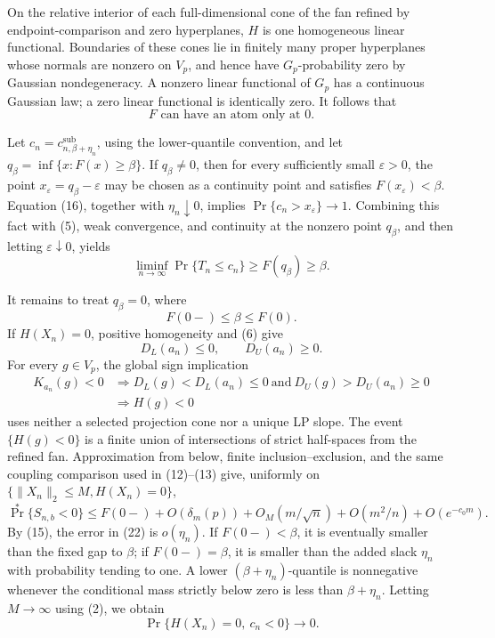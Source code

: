 On the relative interior of each full-dimensional cone of the fan refined by endpoint-comparison and zero hyperplanes, \(H\) is one homogeneous linear functional.  Boundaries of these cones lie in finitely many proper hyperplanes whose normals are nonzero on \(V_p\), and hence have \(G_p\)-probability zero by Gaussian nondegeneracy.  A nonzero linear functional of \(G_p\) has a continuous Gaussian law; a zero linear functional is identically zero.  It follows that
\[
F\text{ can have an atom only at }0.
\tag{17}
\]

Let \(c_n=c^{\mathrm{sub}}_{n,\beta+\eta_n}\), using the lower-quantile convention, and let \(q_\beta=\inf\{x:F(x)\geq\beta\}\).  If \(q_\beta\neq0\), then for every sufficiently small \(\varepsilon>0\), the point \(x_\varepsilon=q_\beta-\varepsilon\) may be chosen as a continuity point and satisfies \(F(x_\varepsilon)<\beta\).  Equation (16), together with \(\eta_n\downarrow0\), implies \(\Pr\{c_n>x_\varepsilon\}\to1\).  Combining this fact with (5), weak convergence, and continuity at the nonzero point \(q_\beta\), and then letting \(\varepsilon\downarrow0\), yields
\[
\liminf_{n\to\infty}\Pr\{T_n\leq c_n\}
\geq F(q_\beta)\geq\beta.
\tag{18}
\]

It remains to treat \(q_\beta=0\), where
\[
F(0-)\leq\beta\leq F(0).
\tag{19}
\]
If \(H(X_n)=0\), positive homogeneity and (6) give
\[
D_L(a_n)\leq0,
\qquad D_U(a_n)\geq0.
\tag{20}
\]
For every \(g\in V_p\), the global sign implication
\[
\begin{aligned}
K_{a_n}(g)<0
&\Longrightarrow D_L(g)<D_L(a_n)\leq0
\ \text{and}\ D_U(g)>D_U(a_n)\geq0\\
&\Longrightarrow H(g)<0
\end{aligned}
\tag{21}
\]
uses neither a selected projection cone nor a unique LP slope.  The event \(\{H(g)<0\}\) is a finite union of intersections of strict half-spaces from the refined fan.  Approximation from below, finite inclusion--exclusion, and the same coupling comparison used in (12)--(13) give, uniformly on \(\{\|X_n\|_2\leq M,H(X_n)=0\}\),
\[
\Pr^*\{S_{n,b}<0\}
\leq F(0-)+O(\delta_m(p))+O_M(m/\sqrt n)
+O(m^2/n)+O(e^{-c_0m}).
\tag{22}
\]
By (15), the error in (22) is \(o(\eta_n)\).  If \(F(0-)<\beta\), it is eventually smaller than the fixed gap to \(\beta\); if \(F(0-)=\beta\), it is smaller than the added slack \(\eta_n\) with probability tending to one.  A lower \((\beta+\eta_n)\)-quantile is nonnegative whenever the conditional mass strictly below zero is less than \(\beta+\eta_n\).  Letting \(M\to\infty\) using (2), we obtain
\[
\Pr\{H(X_n)=0,\ c_n<0\}\longrightarrow0.
\tag{23}
\]

